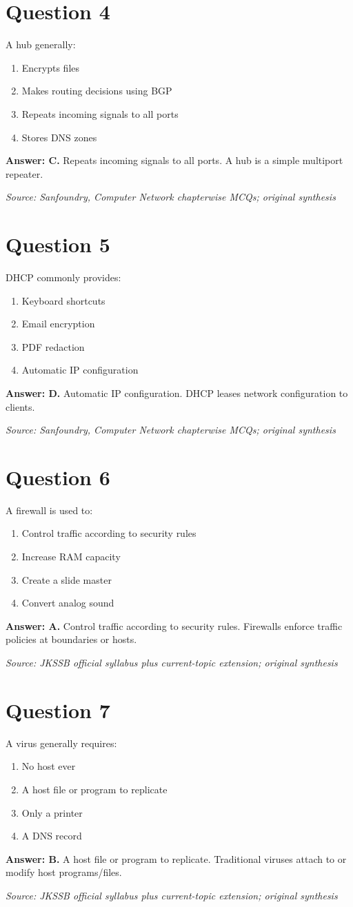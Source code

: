 \documentclass[11pt,a4paper]{book}
\newcommand{\source}[1]{\par\smallskip\textit{Source: #1}}
\newcommand{\answer}[2]{\par\textbf{Answer: #1.} #2}
\begin{document}
\section*{Question 4}
A hub generally:
\begin{enumerate}[label=\Alph*.]
\item Encrypts files
\item Makes routing decisions using BGP
\item Repeats incoming signals to all ports
\item Stores DNS zones
\end{enumerate}
\answer{C}{Repeats incoming signals to all ports. A hub is a simple multiport repeater.}
\source{Sanfoundry, Computer Network chapterwise MCQs; original synthesis}
\section*{Question 5}
DHCP commonly provides:
\begin{enumerate}[label=\Alph*.]
\item Keyboard shortcuts
\item Email encryption
\item PDF redaction
\item Automatic IP configuration
\end{enumerate}
\answer{D}{Automatic IP configuration. DHCP leases network configuration to clients.}
\source{Sanfoundry, Computer Network chapterwise MCQs; original synthesis}
\section*{Question 6}
A firewall is used to:
\begin{enumerate}[label=\Alph*.]
\item Control traffic according to security rules
\item Increase RAM capacity
\item Create a slide master
\item Convert analog sound
\end{enumerate}
\answer{A}{Control traffic according to security rules. Firewalls enforce traffic policies at boundaries or hosts.}
\source{JKSSB official syllabus plus current-topic extension; original synthesis}
\section*{Question 7}
A virus generally requires:
\begin{enumerate}[label=\Alph*.]
\item No host ever
\item A host file or program to replicate
\item Only a printer
\item A DNS record
\end{enumerate}
\answer{B}{A host file or program to replicate. Traditional viruses attach to or modify host programs/files.}
\source{JKSSB official syllabus plus current-topic extension; original synthesis}
\end{document}

